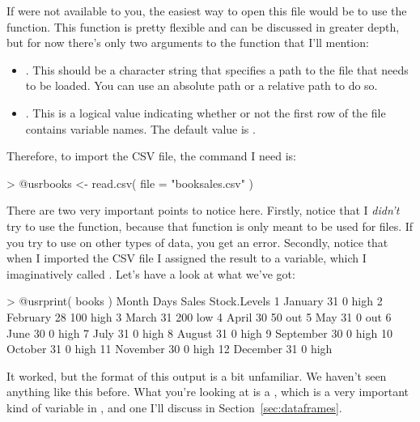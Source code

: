 If \Rstudio were not available to you, the easiest way to open this file would be to use the  function.
This function is pretty flexible and can be discussed in greater depth, but for now there's only two arguments to the function that I'll mention:
\begin{itemize}
\item {}. This should be a character string that specifies a path to the file that needs to be loaded. You can use an absolute path or a relative path to do so.
\item {}. This is a logical value indicating whether or not the first row of the file contains variable names. The default value is . 
\end{itemize}
Therefore, to import the CSV file, the command I need is:
\begin{rblock1}
> @usr{books <- read.csv( file = "booksales.csv" )}
\end{rblock1}
There are two very important points to notice here. Firstly, notice that I {\it didn't} try to use the  function, because that function is only meant to be used for  files. If you try to use  on other types of data, you get an error. Secondly, notice that when I imported the CSV file I assigned the result to a variable, which I imaginatively called .
 Let's have a look at what we've got:
\begin{rblock1}
> @usr{print( books )}
       Month Days Sales Stock.Levels
1    January   31     0         high
2   February   28   100         high
3      March   31   200          low
4      April   30    50          out
5        May   31     0          out
6       June   30     0         high
7       July   31     0         high
8     August   31     0         high
9  September   30     0         high
10   October   31     0         high
11  November   30     0         high
12  December   31     0         high
\end{rblock1}
It worked, but the format of this output is a bit unfamiliar. We haven't seen anything like this before. What you're looking at is a , which is a very important kind of variable in \R, and one I'll discuss in Section~\ref{sec:dataframes}. 


